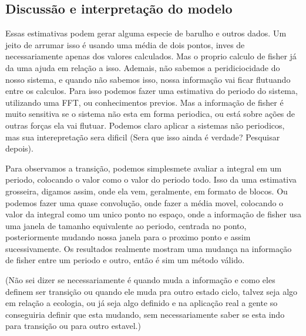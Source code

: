 \documentclass{report}[12pt]
\begin{document}
\subsection{Discussão e interpretação do modelo}
Essas estimativas podem gerar alguma especie de barulho e outros dados. Um jeito de arrumar isso é 
usando uma média de dois pontos, inves de necessariamente apenas dos valores calculados. Mas o proprio
calculo de fisher já da uma ajuda em relação a isso. Ademais, não sabemos a peridiciocidade do nosso
sistema, e quando não sabemos isso, nossa informação vai ficar flutuando entre os calculos. Para isso
podemos fazer uma estimativa do periodo do sistema, utilizando uma FFT, ou conhecimentos previos. Mas
a informação de fisher é muito sensitiva se o sistema não esta em forma periodica, ou está sobre ações
de outras forças ela vai flutuar. Podemos claro aplicar a sistemas não periodicos, mas sua interepretação
sera dificil (Sera que isso ainda é verdade? Pesquisar depois). \par
Para observamos a transição, podemos simplesmete avaliar a integral em um periodo, colocando o valor como o valor do periodo todo. Isso
da uma estimativa grosseira, digamos assim, onde ela vem, geralmente, em formato de blocos. Ou podemos
fazer uma quase convolução, onde fazer a média movel, colocando o valor da integral como um unico ponto
no espaço, onde a informação de fisher usa uma janela de tamanho equivalente ao periodo, centrada no
ponto, posteriormente mudando nossa janela para o proximo ponto e assim sucessivamente. Os resultados
realmente mostram uma mudança na informação de fisher entre um periodo e outro, então é sim um
método válido. \par
(Não sei dizer se necessariamente é quando muda a informação e como eles definem ser transição ou quando
ele muda pra outro estado ciclo, talvez seja algo em relação a ecologia, ou já seja algo definido
e na aplicação real a gente so conseguiria definir que esta mudando, sem necessariamente saber se esta
indo para transição ou para outro estavel.)
\end{document}
